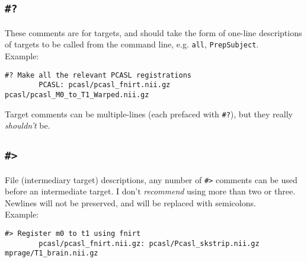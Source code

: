 \documentclass[oneside,11pt]{article}
\begin{document}
	\subsection{\texttt{\#?}}
	
	These comments are for targets, and should take the form of one-line descriptions of targets to be called from the command line, e.g. \texttt{all}, \texttt{PrepSubject}. \\
	Example:
	\begin{lstlisting}[basicstyle=\ttfamily,gobble=16, breaklines=true]
		#? Make all the relevant PCASL registrations
		PCASL: pcasl/pcasl_fnirt.nii.gz pcasl/pcasl_M0_to_T1_Warped.nii.gz	
	\end{lstlisting} 
	
	Target comments can be multiple-lines (each prefaced with \texttt{\#?}), but they really \textit{shouldn't} be.
	
	\subsection{\texttt{\#>}}

	File (intermediary target) descriptions, any number of \texttt{\#>} comments can be used before an intermediate target. I don't \textit{recommend} using more than two or three. Newlines will not be preserved, and will be replaced with semicolons. \\ 
	Example: 
	\begin{lstlisting}[basicstyle=\ttfamily,gobble=16,breaklines=true]
		#> Register m0 to t1 using fnirt
		pcasl/pcasl_fnirt.nii.gz: pcasl/Pcasl_skstrip.nii.gz mprage/T1_brain.nii.gz
	\end{lstlisting}
\end{document}
